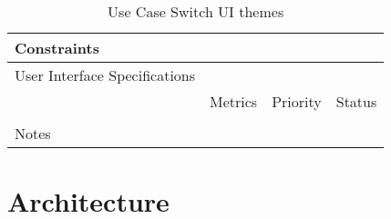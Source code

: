 \begin{table}[H]
\begin{tabularx}{\linewidth}{|l|X|X|X|}
    \hline Constraints                   & \multicolumn{3}{l|}{}                                                                                 \\

    \hline User Interface Specifications & \multicolumn{3}{l|}{}                                                                                 \\

    \hline \multirow{2}{*}{}             & Metrics                                                                           & Priority & Status \\
    \cline{2-4}                          &                                                                                   &          &        \\
    \hline Notes                         & \multicolumn{3}{l|}{}                                                                                 \\
    \hline
  \end{tabularx}
  \caption{Use Case Switch UI themes}
  \label{tab:use_case_switch_ui_themes}
\end{table}

\section*{Architecture}
